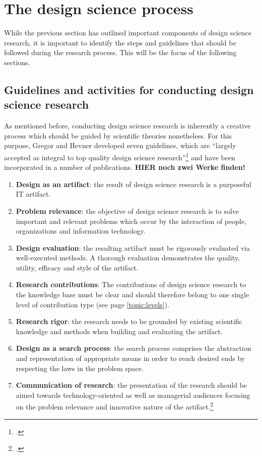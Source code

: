 \section{The design science process}
While the previous section has outlined important components of design science research, it is important to identify the steps and guidelines that should be followed during the research process. This will be the focus of the following sections.

\subsection{Guidelines and activities for conducting design science research}
As mentioned before, conducting design science research is inherently a creative process which should be guided by scientific theories nonetheless. For this purpose, Gregor and Hevner developed seven guidelines, which are \enquote{largely accepted as integral to top quality design science research}\footcite[p.19]{HevnerDesignResearchInformation2010} and have been incorporated in a number of publications. \textbf{HIER noch zwei Werke finden!}
\begin{enumerate}
    \item \textbf{Design as an artifact}: the result of design science research is a purposeful IT artifact.
    \item \textbf{Problem relevance}: the objective of design science research is to solve important and relevant problems which occur by the interaction of people, organizations and information technology.
    \item \textbf{Design evaluation}: the resulting artifact must be rigorously evaluated via well-executed methods. A thorough evaluation demonstrates the quality, utility, efficacy and style of the artifact.
    \item \textbf{Research contributions}: The contributions of design science research to the knowledge base must be clear and should therefore belong to one single level of contribution type (see page \ref{topic:levels}).
    \item \textbf{Research rigor}: the research needs to be grounded by existing scientific knowledge and methods when building and evaluating the artifact.
    \item \textbf{Design as a search process}: the search process comprises the abstraction and representation of appropriate means in order to reach desired ends by respecting the laws in the problem space.
    \item \textbf{Communication of research}: the presentation of the research should be aimed towards technology-oriented as well as managerial audiences focusing on the problem relevance and innovative nature of the artifact.\footcites[Cf.][p.iv]{ZmudEditorComments1997}[cf.][pp.82 et seq]{HevnerDesignScienceResearch2004}[cf.][p.viii]{WeberEditorCommentsStill2003}
\end{enumerate}

